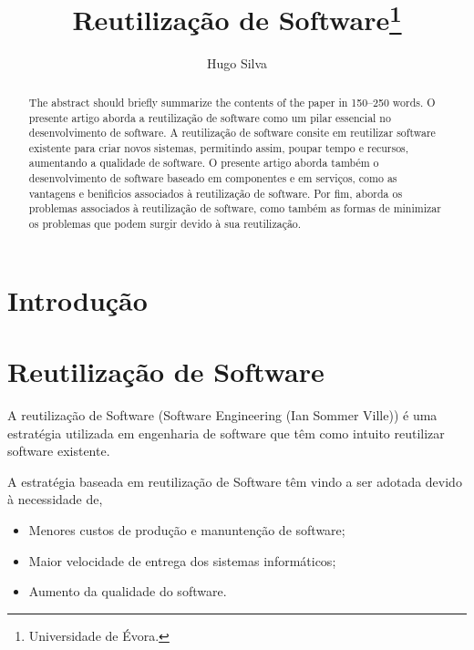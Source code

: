 \documentclass[runningheads]{llncs}
\begin{document}
%
\title{Reutilização de Software\thanks{Universidade de Évora.}}
%
%
\author{Hugo Silva }

%
%
%
\maketitle              %
%
\begin{abstract}

The abstract should briefly summarize the contents of the paper in
150--250 words.
O presente artigo aborda a reutilização de software como um pilar essencial no desenvolvimento de software. A reutilização de software consite em reutilizar software existente para criar novos sistemas, permitindo assim, poupar tempo e recursos, aumentando a qualidade de software. O presente artigo aborda também o desenvolvimento de software baseado em componentes e em serviços, como as vantagens e benificios associados à reutilização de software. Por fim, aborda os problemas associados à reutilização de software, como também as formas de minimizar os problemas que podem surgir devido à sua reutilização.

\end{abstract}
%
%
%
\section{Introdução}

\section{Reutilização de Software}

A reutilização de Software (Software Engineering (Ian Sommer Ville)) é uma estratégia utilizada em engenharia de software que têm como intuito reutilizar software existente.\par
A estratégia baseada em reutilização de Software têm vindo a ser adotada devido à necessidade de,

\begin{itemize}
    \item Menores custos de produção e manuntenção de software;
    \item Maior velocidade de entrega dos sistemas informáticos;
    \item Aumento da qualidade do software.
\end{itemize}
\end{document}
